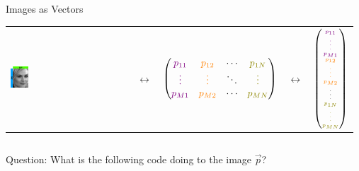 \documentclass[10pt,aspectratio=169,usenames,dvipsnames,handout]{beamer} %
\begin{document}
\begin{frame}[fragile]{Images as Vectors}
\begin{center}
	\begin{tabular}{m{2.5cm} m{1cm} c m{1cm} c}
	\includegraphics[width=0.15\textwidth]{images/vectormatrix/ImageToVector} &
	$\longleftrightarrow$ &
	$\begin{pmatrix}
		\textcolor{violet}{p_{11}} & \textcolor{orange}{p_{12}} & \cdots & \textcolor{olive}{p_{1N}} \\
		\textcolor{violet}{\vdots} & \textcolor{orange}{\vdots} & \ddots & \textcolor{olive}{\vdots} \\
		\textcolor{violet}{p_{M1}} & \textcolor{orange}{p_{M2}} & \cdots &  \textcolor{olive}{p_{MN}} \\
	\end{pmatrix}$ &
	$\longleftrightarrow$ &
	$\tiny{\begin{pmatrix}
		\textcolor{violet}{p_{11}} \\
		\textcolor{violet}{\vdots} \\
		\textcolor{violet}{p_{M1}} \\
		\textcolor{orange}{p_{12}} \\
		\textcolor{orange}{\vdots} \\
		\textcolor{orange}{p_{M2}} \\
		\vdots \\
		\textcolor{olive}{p_{1N}} \\
		\textcolor{olive}{\vdots} \\
		\textcolor{olive}{p_{MN}} \\
	\end{pmatrix}}$
\end{tabular}
\begin{columns}[T,onlytextwidth]
	\column{\textwidth}
	\begin{block}{Question: What is the following code doing to the image $\vec{p}$?}
		\begin{minipage}{0.45\textwidth}
			\hspace{1cm}

\end{minipage}
\end{block}
\end{columns}
\end{center}
\end{frame}
\end{document}
